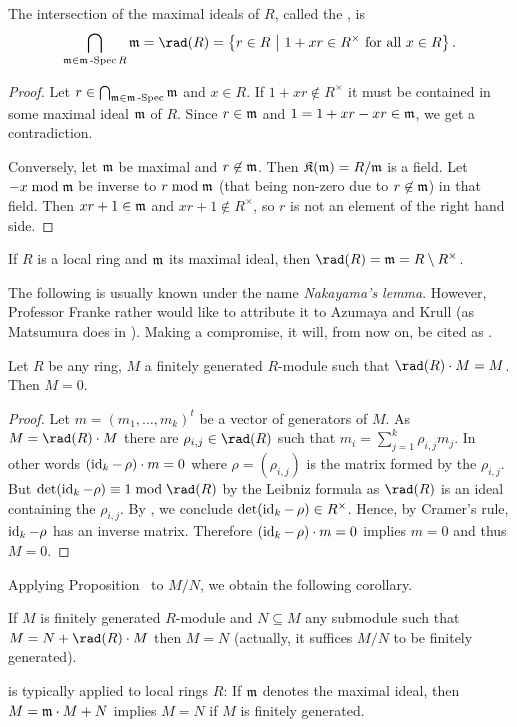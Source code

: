 \documentclass[a4paper,parskip=half,numbers=enddot, DIV=12, headheight=30pt]{scrreprt}
\begin{document}
\begin{prop}
    The intersection of the maximal ideals of $R$, called the , is
    \begin{align}\lbl{eq:JacobsonRadical}
        \bigcap_{\mm \in\mSpec R} \mm = \rad(R) = \left\{r\in R\st1+xr\in R^\times \text{ for all } x\in R\right\}.
    \end{align}
\end{prop}
\begin{proof}
    Let $r\in \bigcap_{\mathfrak{m}\in\mathfrak{m}\operatorname{-Spec}} \mathfrak{m}$ and $x\in R$. If $1+xr\not\in R^\times$ it must be contained in some maximal ideal $\mathfrak{m}$ of $R$. Since $r\in\mathfrak{m}$ and $1 = 1+xr - xr\in\mathfrak{m}$, we get a contradiction. 
    
    Conversely, let $\mathfrak{m}$ be maximal and $r\not\in\mathfrak{m}$. Then $\mathfrak{K}(\mathfrak{m}) = R/\mathfrak{m}$ is a field. Let $-x\bmod \mathfrak{m}$ be inverse to $r\bmod\mathfrak{m}$ (that being non-zero due to $r\not\in\mathfrak{m}$) in that field. Then $xr+1\in\mathfrak{m}$ and $xr+1\not\in R^\times$, so $r$ is not an element of the right hand side.
\end{proof}
\begin{example}
    If $R$ is a local ring and $\mathfrak{m}$ its maximal ideal, then $\rad (R) = \mm = R\setminus R^\times$.
\end{example}
The following is usually known under the name \emph{Nakayama's lemma}. However, Professor Franke rather would like to attribute it to Azumaya and Krull (as Matsumura does in \cite{matsumuraCRT}). Making a compromise, it will, from now on, be cited as \NAK.
\begin{prop}
        Let $R$ be any ring, $M$ a finitely generated $R$-module such that $\rad(R)\cdot M = M$. Then $M=0$.
\end{prop}
\begin{proof}
    Let $m=(m_1,\ldots,m_k)^t$ be a vector of generators of $M$. As $M=\rad(R) \cdot M$ there are $\rho_{i,j}\in\rad(R)$ such that $m_i = \sum_{j=1}^k \rho_{i,j} m_j$. In other words $(\operatorname{id}_k -\,\rho)\cdot m=0$ where $\rho=(\rho_{i,j})$ is the matrix formed by the $\rho_{i,j}$. But $\det(\id_k - \rho) \equiv 1\bmod \rad(R)$ by the Leibniz formula as $\rad(R)$ is an ideal containing the $\rho_{i,j}$. By , we conclude $\operatorname{det}(\operatorname{id}_k -\,\rho)\in R^\times$. Hence, by Cramer's rule, $\operatorname{id}_k-\rho$ has an inverse matrix. Therefore $(\operatorname{id}_k -\,\rho) \cdot m = 0$ implies $m=0$ and thus $M=0$.
\end{proof}
Applying Proposition~ to $M/N$, we obtain the following corollary.
\begin{cor}
    If $M$ is finitely generated $R$-module and $N\subseteq M$ any submodule such that $M = N+\rad(R)\cdot M$ then $M=N$ (actually, it suffices $M/N$ to be finitely generated).
\end{cor}
\begin{rem*}
    {\NAK} is typically applied to local rings $R$: If $\mathfrak{m}$ denotes the maximal ideal, then $M= \mathfrak{m}\cdot M +N$ implies $M=N$ if $M$ is finitely generated.
\end{rem*}
\end{document}

